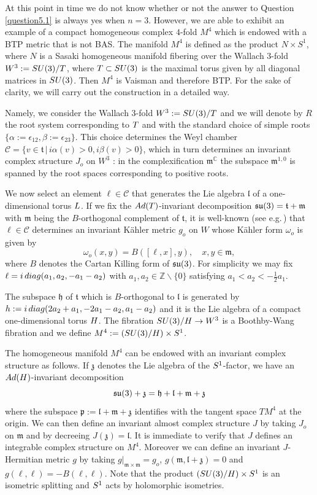 \documentclass{amsart}
\numberwithin{equation}{section}
\theoremstyle{definition}
\renewcommand{\1}{\mathds{1}}
\renewcommand{\a}{\alpha}
\renewcommand{\b}{\beta}
\newcommand{\gz}{\mathfrak z}
\newcommand{\gp}{\mathfrak p}
\newcommand{\gl}{\mathfrak l}
\newcommand{\gh}{\mathfrak h}
\newcommand{\gm}{\mathfrak m}
\newcommand{\gt}{\mathfrak t}
\newcommand{\SU}{\rm {SU}}
\newcommand{\T}{\rm{T}}
\renewcommand{\>}{\rightarrow}
\begin{document}
At this point in time we do not know whether or not the answer to Question \ref{question5.1} is always yes when $n=3$. However,  we are able to exhibit an example of
a compact homogeneous complex $4$-fold $M^4$ which is endowed with a {\rm BTP} metric that is not {\rm BAS}.  The manifold $M^4$ is defined as the product $N\times S^1$, where
$N$ is a Sasaki homogeneous manifold fibering over the Wallach $3$-fold $W^3:= \SU(3)/\T$, where $\T\subset \SU(3)$ is the maximal torus given by all diagonal matrices in $\SU(3)$. Then $M^4$ is Vaisman and therefore {\rm BTP}. For the sake of clarity, we will carry out the construction in a detailed way.  \par
Namely, we consider the Wallach $3$-fold $W^3:= \SU(3)/\T$ and we will denote by $R$ the root system corresponding to $\T$ and with the standard choice of simple roots $\{\a:=\epsilon_{12},\beta:=\epsilon_{23}\}$. This choice determines the Weyl chamber $\mathcal C=\{v\in\gt \,|\,i\a(v)>0,i\b(v)>0\}$, which in turn determines an invariant complex structure $J_o$ on $W^3$ : in the complexification $\gm^{\mathbb C}$ the subspace $\gm^{1,0}$ is spanned by the root spaces corresponding to positive roots.

We now select an element $\ell\in\mathcal C$ that generates the Lie algebra $\gl$ of a one-dimensional torus $\rm L$. If we fix the ${\rm{Ad}}(\T)$-invariant decomposition ${\frak {su}}(3)=\gt +\gm$ with $\gm$ being the $B$-orthogonal complement of $\gt$, it is well-known (see e.g.\,\cite{BFR}) that $\ell\in \mathcal C$ determines an invariant K\"ahler metric $g_o$ on $W$ whose K\"ahler form $\omega_o$ is given by
\begin{equation} \omega_o(x,y) = B([\ell,x],y),\quad x,y\in\gm,\end{equation}
where $B$ denotes the Cartan Killing form of $\frak{su}(3)$. For simplicity we may fix $\ell= i\,{\rm{diag}}(a_1,a_2,-a_1-a_2)$ with $a_1,a_2\in\mathbb Z\backslash\{0\}$ satisfying
$a_1<a_2<-\frac 12 a_1$.

The subspace $\gh$ of $\gt$ which is $B$-orthogonal to $\gl$ is generated by $h:=i\,{\rm{diag}}(2a_2+a_1,-2a_1-a_2,a_1-a_2)$ and it is the Lie algebra of a compact one-dimensional torus $\rm H$. The fibration $\SU(3)/\rm H\to W^3$ is a Boothby-Wang fibration and we define $M^4 := (\SU(3)/\rm H) \times S^1$.

The homogeneous manifold $M^4$ can be endowed with an invariant complex structure as follows. If $\gz$ denotes the Lie algebra of the $\rm S^1$-factor, we have an ${\rm{Ad}}(\rm H)$-invariant decomposition
$$\frak{su}(3)+\gz = \gh + \gl + \gm +\gz $$
where the subspace $\gp:= \gl + \gm +\gz $ identifies with the tangent space $TM^4$ at the origin. We can then define an invariant almost complex structure $J$ by taking $J_o$ on $\gm$ and by decreeing $J(\gz)=\gl$. It is immediate to verify that $J$ defines an integrable complex structure on $M^4$. Moreover we can define an invariant $J$-Hermitian metric $g$ by taking $g|_{\gm\times\gm}= g_o$, $g(\gm,\gl+\gz)=0$ and $g(\ell,\ell) = -B(\ell,\ell)$.  Note that the product $(\SU(3)/\rm H) \times S^1$ is an
isometric splitting and $\rm S^1$ acts by holomorphic isometries.
\end{document}
